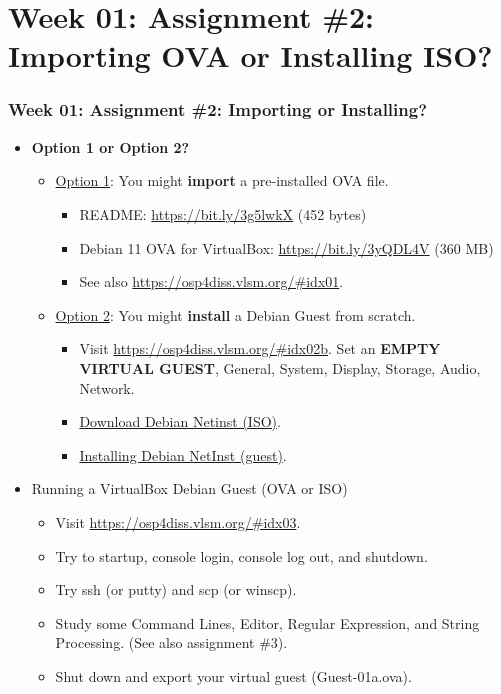 \documentclass[xcolor=table, notheorems, hyperref={pdfpagelabels=false}]{beamer}
\begin{document}
\section{Week 01: Assignment \#2: Importing OVA or Installing ISO?}
\begin{frame}[fragile]
\frametitle{Week 01: Assignment \#2: Importing or Installing?}
\begin{itemize}
\item \textbf{Option 1 or Option 2?}
\begin{itemize}
\item \href{https://osp4diss.vlsm.org/\#idx02a}{Option 1}: 
      You might \textbf{import} a pre-installed OVA file.
\begin{itemize}
\item README: \url{https://bit.ly/3g5lwkX} (452 bytes)
\item Debian 11 OVA for VirtualBox: \url{https://bit.ly/3yQDL4V} (360 MB)
\item See also \url{https://osp4diss.vlsm.org/#idx01}.
\end{itemize}
\item \href{https://osp4diss.vlsm.org/\#idx02b}{Option 2}: 
      You might \textbf{install} a Debian Guest from scratch.
\begin{itemize}
\item Visit \url{https://osp4diss.vlsm.org/\#idx02b}.
      Set an \textbf{EMPTY VIRTUAL GUEST}, General, System, Display, Storage, Audio, Network.
\item \href{https://cdimage.debian.org/debian-cd/current/amd64/iso-cd/}{Download Debian Netinst (ISO)}.
\item \href{https://osp4diss.vlsm.org/InstallDebianNetinst.html}{Installing Debian NetInst (guest)}.
\end{itemize}
\end{itemize}
\item Running a VirtualBox Debian Guest (OVA or ISO)
\begin{itemize}
\item Visit \url{https://osp4diss.vlsm.org/\#idx03}.
\item Try to startup, console login, console log out, and shutdown.
\item Try ssh (or putty) and scp (or winscp).
\item Study some Command Lines, Editor, Regular Expression, and String Processing.
      (See also assignment \#3).
\item Shut down and export your virtual guest (Guest-01a.ova).
\end{itemize}
\end{itemize}

\end{frame}
\end{document}
